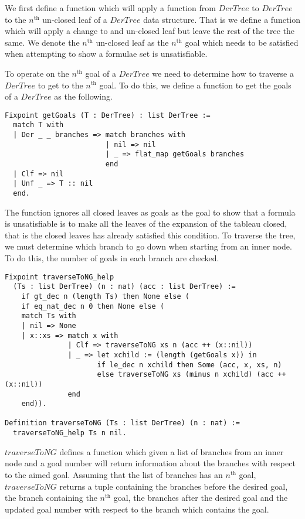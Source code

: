 \documentclass{article}
\begin{document}
We first define a function which will apply a function from $DerTree$ to
$DerTree$ to the $n^{\text{th}}$ un-closed leaf of a $DerTree$ data structure. 
That is we define a function which will apply a change to and un-closed leaf
but leave the rest of the tree the same. We denote the $n^{\text{th}}$
un-closed leaf as the $n^{\text{th}}$ goal which needs to be satisfied when
attempting to show a formulae set is unsatisfiable. 

To operate on the $n^{\text{th}}$ goal of a $DerTree$ we need to determine
how to traverse a $DerTree$ to get to the $n^{\text{th}}$ goal. To do this, we
define a function to get the goals of a $DerTree$ as the following.

\begin{lstlisting}
Fixpoint getGoals (T : DerTree) : list DerTree :=
  match T with
  | Der _ _ branches => match branches with
                        | nil => nil
                        | _ => flat_map getGoals branches
                        end
  | Clf => nil
  | Unf _ => T :: nil
  end.
\end{lstlisting}

The function ignores all closed leaves as goals as the goal to show that a
formula is unsatisfiable is to make all the leaves of the expansion of the
tableau closed, that is the closed leaves has already satisfied this
condition. To traverse the tree, we must determine which branch to go down when
starting from an inner node. To do this, the number of goals in each branch are
checked.

\begin{lstlisting}
Fixpoint traverseToNG_help
  (Ts : list DerTree) (n : nat) (acc : list DerTree) :=
    if gt_dec n (length Ts) then None else (
    if eq_nat_dec n 0 then None else (
    match Ts with
    | nil => None
    | x::xs => match x with
               | Clf => traverseToNG xs n (acc ++ (x::nil))
               | _ => let xchild := (length (getGoals x)) in
                      if le_dec n xchild then Some (acc, x, xs, n)
                      else traverseToNG xs (minus n xchild) (acc ++ (x::nil))
               end
    end)).

Definition traverseToNG (Ts : list DerTree) (n : nat) :=
  traverseToNG_help Ts n nil.
\end{lstlisting}

$traverseToNG$ defines a function which given a list of branches from an inner
node and a goal number will return information about the branches with respect
to the aimed goal. Assuming that the list of branches has an $n^{\text{th}}$
goal, $traverseToNG$ returns a tuple containing the branches before the desired
goal, the branch containing the $n^{\text{th}}$ goal, the branches after the
desired goal and the updated goal number with respect to the branch which
contains the goal.
\end{document}
